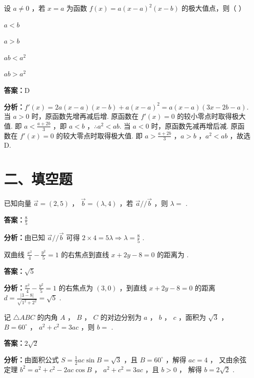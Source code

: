 \begin{question}[points=5]
设 $a \neq 0$ ，若 $x = a$ 为函数 $f(x) = a(x-a)^2(x-b)$ 的极大值点，则（ ）
\begin{choices}
  \item $a < b$
  \item $a > b$
  \item $ab < a^2$
  \item $ab > a^2$
\end{choices}
\begin{solution}
\textbf{答案：}D

\textbf{分析：}$f'(x) = 2a(x-a)(x-b) + a(x-a)^2 = a(x-a)(3x-2b-a)$.
当 $a > 0$ 时，原函数先增再减后增.
原函数在 $f'(x)=0$ 的较小零点时取得极大值.
即 $a < \frac{a+2b}{3}$ ，即 $a < b$ ，$\therefore a^2 < ab$.
当 $a < 0$ 时，原函数先减再增后减.
原函数在 $f'(x)=0$ 的较大零点时取得极大值.
即 $a > \frac{a+2b}{3}$ ，$a > b$ ，$a^2 < ab$ ，故选 D.
\end{solution}
\end{question}

\section*{二、填空题}

\begin{question}[points=5]
已知向量 $\vec{a} = (2,5)$ ， $\vec{b} = (\lambda, 4)$ ，若 $\vec{a} // \vec{b}$ ，则 $\lambda =$ .
\fillin[{$\frac{8}{5}$}]
\begin{solution}
\textbf{答案：}$\frac{8}{5}$

\textbf{分析：}由已知 $\vec{a} // \vec{b}$ 可得 $2 \times 4 = 5\lambda \Rightarrow \lambda = \frac{8}{5}$ .
\end{solution}
\end{question}

\begin{question}[points=5]
双曲线 $\frac{x^2}{4} - \frac{y^2}{5} = 1$ 的右焦点到直线 $x + 2y - 8 = 0$ 的距离为 .
\fillin[{$\sqrt{5}$}]
\begin{solution}
\textbf{答案：}$\sqrt{5}$

\textbf{分析：}$\frac{x^2}{4} - \frac{y^2}{5} = 1$ 的右焦点为 $(3,0)$ ，到直线 $x + 2y - 8 = 0$ 的距离 $d = \frac{|3-8|}{\sqrt{1^2+2^2}} = \sqrt{5}$ .
\end{solution}
\end{question}

\begin{question}[points=5]
记 $\triangle ABC$ 的内角 $A$ ， $B$ ， $C$ 的对边分别为 $a$ ， $b$ ， $c$ ，面积为 $\sqrt{3}$ ， $B = 60^\circ$ ， $a^2 + c^2 = 3ac$ ，则 $b =$ .
\fillin[{$2\sqrt{2}$}]
\begin{solution}
\textbf{答案：}$2\sqrt{2}$

\textbf{分析：}由面积公式 $S = \frac{1}{2}ac\sin B = \sqrt{3}$ ，且 $B = 60^\circ$ ，解得 $ac = 4$ ，
又由余弦定理 $b^2 = a^2 + c^2 - 2ac\cos B$ ， $a^2 + c^2 = 3ac$ ，且 $b > 0$ ，
解得 $b = 2\sqrt{2}$ .
\end{solution}
\end{question}

